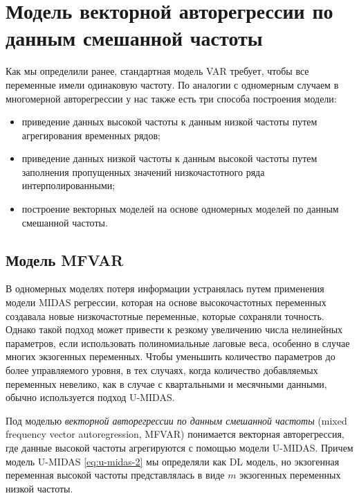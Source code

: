 \documentclass[a4paper, 14pt]{extreport}
\numberwithin{equation}{section}
\numberwithin{equation}{section}
\begin{document}
	\section{Модель векторной авторегрессии по данным смешанной частоты}
	\label{sec:mfvar}
	Как мы определили ранее, стандартная модель VAR требует, чтобы все переменные имели одинаковую частоту. По аналогии с одномерным случаем в многомерной авторегрессии у нас также есть три способа построения модели:
	\begin{itemize}
		\item приведение данных высокой частоты к данным низкой частоты путем агрегирования временных рядов;
		\item приведение данных низкой частоты к данным высокой частоты путем заполнения пропущенных значений низкочастотного ряда интерполированными;
		\item построение векторных моделей на основе одномерных моделей по данным смешанной частоты.
	\end{itemize}
	
	
	\subsection{Модель MFVAR}
	
	В одномерных моделях потеря информации устранялась путем применения модели MIDAS регрессии, которая на основе высокочастотных переменных создавала новые низкочастотные переменные, которые сохраняли точность. Однако такой подход может привести к резкому увеличению числа нелинейных параметров, если использовать полиномиальные лаговые веса, особенно в случае многих экзогенных переменных. Чтобы
	уменьшить количество параметров до более управляемого уровня, в тех случаях, когда количество
	добавляемых переменных невелико, как в случае с квартальными и месячными данными, обычно используется  подход U-MIDAS.
	
	Под моделью \textit{векторной авторегрессии по данным смешанной частоты} (mixed frequency vector autoregression, MFVAR) понимается векторная авторегрессия, где данные высокой частоты агрегируются с помощью модели U-MIDAS. Причем модель U-MIDAS  \eqref{eq:u-midas-2} мы определяли как DL модель, но экзогенная переменная высокой частоты представлялась в виде $m$ экзогенных переменных низкой частоты. 
	
\end{document}
